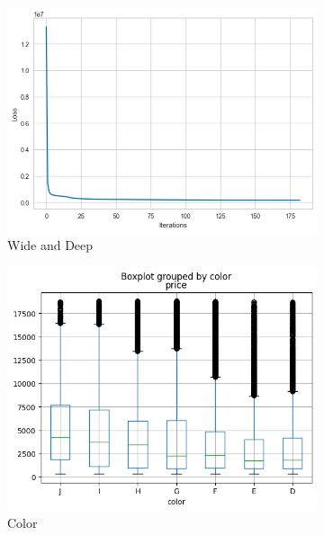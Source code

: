 \documentclass[11pt,letterpaper]{article}
\begin{document}
\begin{figure}[H]
    \centering
    \begin{subfigure}[b]{0.3\textwidth}
        \centering
        \includegraphics[width=\textwidth]{../Figures/mlp/mlp1.png}
        \caption{Wide and Deep}
        \label{fig:clarityBox}
    \end{subfigure}
    \hfill
    \begin{subfigure}[b]{0.3\textwidth}
        \centering
        \includegraphics[width=\textwidth]{../Figures/Question-1/colorBox.png}
        \caption{Color}
        \label{fig:colorBox}
    \end{subfigure}
    \hfill
    \begin{subfigure}[b]{0.3\textwidth}

\end{subfigure}
\end{figure}
\end{document}
